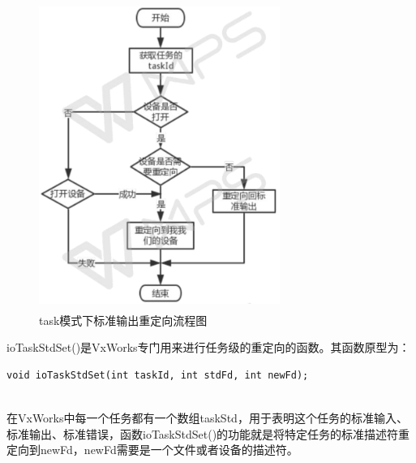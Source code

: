 \begin{figure}[!h]
\centering
\includegraphics[width=0.7\textwidth ,height=10cm]{./graphics/TASK-STDOUT-RESET.pdf}
\caption{task模式下标准输出重定向流程图}\label{fig:task-printf-reset}
\end{figure}

ioTaskStdSet()是VxWorks专门用来进行任务级的重定向的函数。其函数原型为：
\lstset{language=C}
\begin{lstlisting}
void ioTaskStdSet(int taskId, int stdFd, int newFd);
\end{lstlisting}\\
在VxWorks中每一个任务都有一个数组taskStd，用于表明这个任务的标准输入、标准输出、标准错误，函数ioTaskStdSet()的功能就是将特定任务的标准描述符重定向到newFd，newFd需要是一个文件或者设备的描述符。


